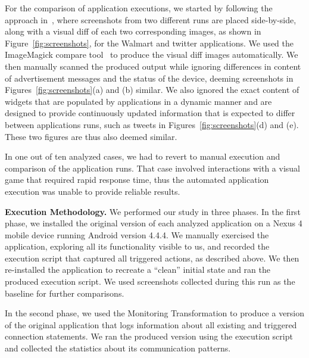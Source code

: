 For the comparison of application executions, we started by following the approach in~\cite{Hornyack:Han:Jung:Schechter:Wetherall:CCS11}, where screenshots from two different runs are placed side-by-side, 
along with a visual diff of each two corresponding images, as shown in Figure~\ref{fig:screenshots}, for 
the Walmart and twitter applications. 
We used the ImageMagick compare tool~\cite{imagemagick}
to produce the visual diff images automatically. 
We then manually scanned the produced output while ignoring differences in content of advertisement messages and the status of the device, deeming screenshots in Figures~\ref{fig:screenshots}(a) and (b) similar. 
We also ignored the exact content of widgets that are populated by applications in a dynamic manner and are designed to 
provide continuously updated information that is expected to differ between applications runs, such as tweets in Figures~\ref{fig:screenshots}(d) and (e). These two figures are thus also deemed similar.

In one out of ten analyzed cases, we had to revert to manual execution and comparison of the application runs.
That case involved interactions with a visual game that required rapid response time, 
thus the automated application execution was unable to provide reliable results. 


\vspace{0.1in}
\noindent 
{\bf Execution Methodology.}
We performed our study in three phases. In the first phase, we installed the original version of each analyzed 
application on a Nexus 4 mobile device running Android version 4.4.4.
We manually exercised the application, exploring all its functionality visible to us, and recorded the execution script that captured all triggered actions, as described above. 
We then re-installed the application to recreate a ``clean'' initial state and ran the produced execution script.  
We used screenshots collected during this run as the baseline for further comparisons. 

In the second phase, we used the Monitoring Transformation to produce a version of the original application that logs information about all existing and triggered connection statements. We ran the produced version using the execution script and collected the statistics about its communication patterns.  

